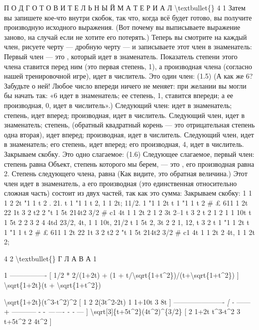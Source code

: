 \documentclass[10pt,oneside]{article}
\begin{document}
П О Д Г О Т О В И Т Е Л Ь Н Ы Й  М А Т Е Р И А Л \textbackslash{}textbullet\{\} 4 1 Затем вы запишете кое-что внутри скобок, так что, когда всё будет готово, вы получите производную исходного выражения. (Вот почему вы выписываете выражение заново, на случай если не хотите его потерять.) Теперь вы смотрите на каждый член, рисуете черту --- дробную черту --- и записываете этот член в знаменатель: Первый член --- это , который идет в знаменатель. Показатель степени этого члена ставится перед ним (это первая степень, 1), а производная члена (согласно нашей тренировочной игре), идет в числитель. Это один член: (1.5) (А как же 6? Забудьте о ней! Любое число впереди ничего не меняет: при желании вы могли бы начать так: «6 идет в знаменатель; ее степень, 1, ставится впереди; а ее производная, 0, идет в числитель».) Следующий член: идет в знаменатель; степень, идет вперед; производная, идет в числитель. Следующий член, идет в знаменатель; степень, (обратный квадратный корень --- это отрицательная степень одна вторая), идет вперед; производная, идет в числитель. Следующий член, идет в знаменатель; его степень, идет вперед; его производная, 4, идет в числитель. Закрываем скобку. Это одно слагаемое: (1.6) Следующее слагаемое, первый член: степень равна Объект, степень которого мы берем, --- это , его производная равна 2. Степень следующего члена, равна (Как видите, это обратная величина.) Этот член идет в знаменатель, а его производная (это единственная относительно сложная часть) состоит из двух частей, так как это сумма: Закрываем скобку: 1 1 1 2 2t "1 1 t 2 . 21. t 1 "1 1 t 2, 1 1 2t; 11/2. 1 "1 1 2t t 1 "1 1 t 2 \# £ 611 1 2t 22 1t 3 2 t2 2 "t 1 5t 214t2 3/2 \# c1 4t 1 1 2t 2 1 2 3t 2–1 t 3 2 t 2 1 2 1 1 10t t 1 5t 2 2 3 2 4 4td 23/2, 4t, 1 1 10t, 21/2 t 1 5t 2, 3t 2 2 1, 12, t 3 2 t 1 "1 1 2t t 1 "1 1 t 2 \# £ 611 1 2t 22 1t 3 2 t2 2 "t 1 5t 214t2 3/2 \# c1 4t 1 1 2t 2 4t, 1 1 2t 2;\par

4 2 \textbackslash{}textbullet\{\} Г Л А В А  1\par

1 ---------------- [ 1/2 * 2/(1+2t) + (1 + t/\textbackslash{}sqrt\{1+t\textasciicircum{}2\})/(t+\textbackslash{}sqrt\{1+t\textasciicircum{}2\}) ] \textbackslash{}sqrt\{1+2t\}(t + \textbackslash{}sqrt\{1+t\textasciicircum{}2\})\par

\textbackslash{}sqrt\{1+2t\}(t\textasciicircum{}3-t\textasciicircum{}2)\textasciicircum{}2   [ 1   2      2(3t\textasciicircum{}2-2t)   1   1+10t     3   8t  ] ---------------------- \emph{ [ - } ------ + ----------- - - \emph{ ------- - - } --- ] \textbackslash{}sqrt[3]\{t+5t\textasciicircum{}2\}(4t\textasciicircum{}2)\textasciicircum{}\{3/2\}   [ 2   1+2t     t\textasciicircum{}3-t\textasciicircum{}2     3   t+5t\textasciicircum{}2    2   4t\textasciicircum{}2 ]\par
\end{document}
